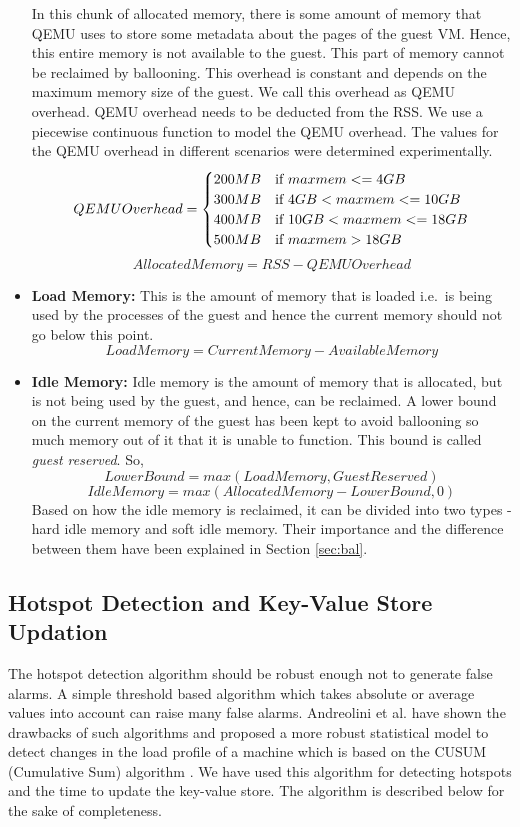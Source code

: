 \begin{itemize}
In this chunk of allocated memory, there is some amount of memory that QEMU uses to store some metadata about the pages of the guest VM. Hence, this entire memory is not available to the guest. This part of memory cannot be reclaimed by ballooning. This overhead is constant and depends on the maximum memory size of the guest. We call this overhead as QEMU overhead. QEMU overhead needs to be deducted from the RSS. We use a piecewise continuous function to model the QEMU overhead. The values for the QEMU overhead in different scenarios were determined experimentally.
\[
QEMU Overhead =
  \begin{cases} 
      \hfill 200 MB    \hfill & \text{if $maxmem <= 4GB$} \\
      \hfill 300 MB \hfill & \text{if $ 4GB < maxmem <= 10GB$} \\
      \hfill 400MB \hfill & \text{if $ 10GB < maxmem <= 18GB$} \\
      \hfill 500MB \hfill & \text{if $ maxmem > 18GB$} \\
  \end{cases}
\]
$$ Allocated Memory = RSS - QEMU Overhead$$
\item \textbf{Load Memory:} This is the amount of memory that is loaded i.e.\ is being used by the processes of the guest and hence the current memory should not go below this point. 
$$Load Memory = Current Memory - Available Memory$$
\item \textbf{Idle Memory:} Idle memory is the amount of memory that is allocated, but is not being used by the guest, and hence, can be reclaimed. A lower bound on the current memory of the guest has been kept to avoid ballooning so much memory out of it that it is unable to function. This bound is called \textit{guest reserved}. So,
$$LowerBound = max(LoadMemory, GuestReserved)$$
$$Idle Memory = max(Allocated Memory - LowerBound, 0)$$
Based on how the idle memory is reclaimed, it can be divided into two types - hard idle memory and soft idle memory. Their importance and the difference between them have been explained in Section \ref{sec:bal}.
\end{itemize}

\subsection{Hotspot Detection and Key-Value Store Updation}
The hotspot detection algorithm should be robust enough not to generate false alarms. A simple threshold based algorithm which takes absolute or average values into account can raise many false alarms. Andreolini et al. \cite{andreolini2009dynamic} have shown the drawbacks of such algorithms and proposed a more robust statistical model to detect changes in the load profile of a machine which is based on the CUSUM (Cumulative Sum) algorithm \cite{page1957estimating}. We have used this algorithm for detecting hotspots and the time to update the key-value store. The algorithm is described below for the sake of completeness.

